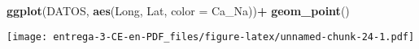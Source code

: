 \documentclass[
]{article}
\newenvironment{Shaded}{\begin{snugshade}}{\end{snugshade}}
\newcommand{\DataTypeTok}[1]{\textcolor[rgb]{0.13,0.29,0.53}{#1}}
\newcommand{\DecValTok}[1]{\textcolor[rgb]{0.00,0.00,0.81}{#1}}
\newcommand{\KeywordTok}[1]{\textcolor[rgb]{0.13,0.29,0.53}{\textbf{#1}}}
\newcommand{\NormalTok}[1]{#1}
\newcommand{\OperatorTok}[1]{\textcolor[rgb]{0.81,0.36,0.00}{\textbf{#1}}}
\newcommand{\StringTok}[1]{\textcolor[rgb]{0.31,0.60,0.02}{#1}}
\begin{document}
\begin{Shaded}
\begin{Highlighting}[]
\KeywordTok{ggplot}\NormalTok{(DATOS, }\KeywordTok{aes}\NormalTok{(Long, Lat, }\DataTypeTok{color =}\NormalTok{ Ca_Na))}\OperatorTok{+}
\StringTok{  }\KeywordTok{geom_point}\NormalTok{()}
\end{Highlighting}
\end{Shaded}

\texttt{[image: entrega-3-CE-en-PDF\_files/figure-latex/unnamed-chunk-24-1.pdf]}

\begin{Shaded}
\end{Shaded}
\end{document}
